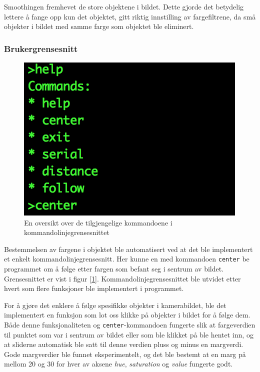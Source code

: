 Smoothingen fremhevet de store objektene i bildet. Dette gjorde det betydelig lettere å fange opp kun det objektet, gitt riktig innstilling av fargefiltrene, da små objekter i bildet med samme farge som objektet ble eliminert.

\newpage
\subsubsection{Brukergrensesnitt}

\begin{figure}
	\centering
	\includegraphics[width=\linewidth]{img/command-menu.png}
	\caption{En oversikt over de tilgjengelige kommandoene i kommandolinjegrensesnittet}
	\label{fig:commandmenu}
\end{figure}

Bestemmelsen av fargene i objektet ble automatisert ved at det ble implementert et enkelt kommandolinjegrensesnitt. Her kunne en med kommandoen \texttt{center} be programmet om å følge etter fargen som befant seg i sentrum av bildet. Grensesnittet er vist i figur [\ref{fig:commandmenu}]. Kommandolinjegrensesnittet ble utvidet etter hvert som flere funksjoner ble implementert i programmet.

For å gjøre det enklere å følge spesifikke objekter i kamerabildet, ble det implementert en funksjon som lot oss klikke på objekter i bildet for å følge dem. Både denne funksjonaliteten og \texttt{center}-kommandoen fungerte slik at fargeverdien til punktet som var i sentrum av bildet eller som ble klikket på ble hentet inn, og at sliderne automatisk ble satt til denne verdien pluss og minus en margverdi. Gode margverdier ble funnet eksperimentelt, og det ble bestemt at en marg på mellom $20$ og $30$ for hver av aksene \emph{hue}, \emph{saturation} og \emph{value} fungerte godt.

